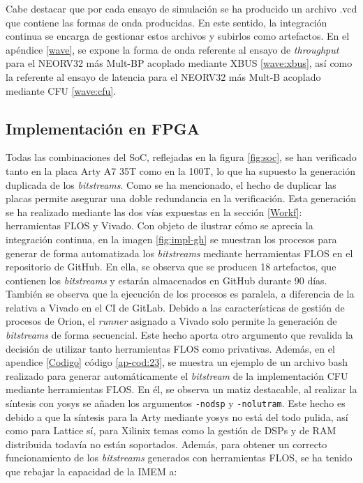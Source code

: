Cabe destacar que por cada ensayo de simulación se ha producido un archivo .vcd que contiene las formas de onda producidas.
En este sentido, la integración continua se encarga de gestionar estos archivos y subirlos como artefactos.
En el apéndice \ref{wave}, se expone la forma de onda referente al ensayo de \textit{throughput} para el NEORV32 más Mult-BP acoplado mediante XBUS \ref{wave:xbus}, así como la referente al ensayo de latencia para el NEORV32 más Mult-B acoplado mediante CFU  \ref{wave:cfu}.

\subsection{Implementación en FPGA}


Todas las combinaciones del SoC, reflejadas en la figura \ref{fig:soc}, se han verificado tanto en la placa Arty A7 35T como en la 100T, lo que ha supuesto la generación duplicada de los \textit{bitstreams}.
Como se ha mencionado, el hecho de duplicar las placas permite asegurar una doble redundancia en la verificación.
Esta generación se ha realizado mediante las dos vías expuestas en la sección \ref{Workf}: herramientas FLOS y Vivado.
Con objeto de ilustrar cómo se aprecia la integración continua, en la imagen \ref{fig:impl-gh} se muestran los procesos para generar de forma automatizada los \textit{bitstreams} mediante herramientas FLOS en el repositorio de GitHub. 
En ella, se observa que se producen 18 artefactos, que contienen los \textit{bitstreams} y estarán almacenados en GitHub durante 90 días.
También se observa que la ejecución de los procesos es paralela, a diferencia de la relativa a Vivado en el CI de GitLab.
Debido a las características de gestión de procesos de Orion, el \textit{runner} asignado a Vivado solo permite la generación de \textit{bitstreams} de forma secuencial.
Este hecho aporta otro argumento que revalida la decisión de utilizar tanto herramientas FLOS como privativas.
Además, en el apendice \ref{Codigo} código \ref{ap-cod:23}, se muestra un ejemplo de un archivo bash realizado para generar automáticamente el \textit{bitstream} de la implementación CFU mediante herramientas FLOS.
En él, se observa un matiz destacable, al realizar la síntesis con yosys se añaden los argumentos  \texttt{-nodsp} y \texttt{-nolutram}.
Este hecho es debido a que la síntesis para la Arty mediante yosys no está del todo pulida, así como para Lattice sí, para Xilinix temas como la gestión de DSPs y de RAM distribuida todavía no están soportados.
Además, para obtener un correcto funcionamiento de los \textit{bitstreams} generados con herramientas FLOS, se ha tenido que rebajar la capacidad de la IMEM a:

